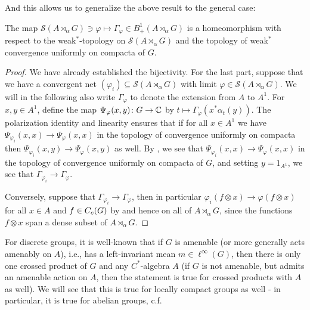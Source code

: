 And this allows us to generalize the above result to the general case:
\begin{proposition}
	The map $\mathcal{S}(A \rtimes_\alpha G) \ni \varphi \mapsto \Gamma_\varphi \in B_+^1(A \rtimes_\alpha G)$ is a homeomorphism with respect to the weak$^*$-topology on $\mathcal{S}(A \rtimes_\alpha G)$ and the topology of weak$^*$ convergence uniformly on compacta of $G$.	
\end{proposition}
\begin{proof}
	We have already established the bijectivity. For the last part, suppose that we have a convergent net $(\varphi_i) \subseteq \mathcal{S}(A \rtimes _\alpha  G)$	with limit $\varphi \in \mathcal{S}(A \rtimes_\alpha G)$. We will in the following also write $\Gamma_\varphi$ to denote the extension from $A$ to $A^1$. For $x,y \in A^1$, define the map $\Psi_{\varphi}(x,y) \colon G \to \mathbb{C}$ by $t \mapsto \Gamma_\varphi(x^* \alpha_t(y))$. The polarization identity and linearity ensures that if for all $x \in A^1$ we have $\Psi_{\varphi_i}(x,x) \to \Psi_{\varphi}(x,x)$ in the topology of convergence uniformly on compacta then $\Psi_{\varphi_i}(x,y) \to \Psi_{\varphi}(x,y)$ as well. By , we see that $\Psi_{\varphi_i}(x,x) \to \Psi_{\varphi}(x,x)$ in the topology of convergence uniformly on compacta of $G$, and setting $y = 1_{A^1}$, we see that $\Gamma_{\varphi_i} \to \Gamma_\varphi$.

	Conversely, suppose that $\Gamma_{\varphi_i} \to \Gamma_{\varphi}$, then in particular $\varphi_{i}(f \otimes x) \to \varphi(f \otimes x)$ for all $x \in A$ and $f \in C_c(G)$ by  and hence on all of $A \rtimes_\alpha G$, since the functions $f \otimes x$ span a dense subset of $A \rtimes_\alpha G$.
\end{proof}

For discrete groups, it is well-known  that if $G$ is amenable (or more generally acts amenably on $A$), i.e., has a left-invariant mean $m \in \ell^\infty(G)$, then there is only one crossed product of $G$ and any $C^*$-algebra $A$ (if $G$ is not amenable, but admits an amenable action on $A$, then the statement is true for crossed products with $A$ as well). We will see that this is true for locally compact groups as well - in particular, it is true for abelian groups, c.f. \cite{bekka2008kazhdan}

